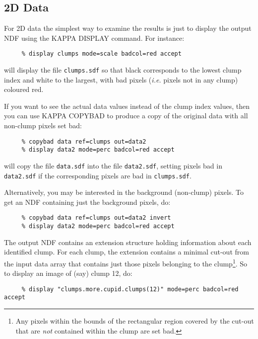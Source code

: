 \documentclass[twoside,11pt]{article}
\newcommand{\xref}[3]{#1}
\renewcommand{\_}{\texttt{\symbol{95}}}
\begin{document}
\subsection{2D Data}
For 2D data the simplest way to examine the results is just
to display the output NDF using the KAPPA \xref{DISPLAY}{sun95}{DISPLAY}
command. For instance:

\small
\begin{verbatim}
     % display clumps mode=scale badcol=red accept
\end{verbatim}
\normalsize

will display the file \verb+clumps.sdf+ so that black corresponds to the
lowest clump index and white to the largest, with bad pixels (\emph{i.e.}
pixels not in any clump) coloured red.

If you want to see the actual data values instead of the clump index
values, then you can use KAPPA \xref{COPYBAD}{sun95}{COPYBAD} to produce a
copy of the original data with all non-clump pixels set bad:

\small
\begin{verbatim}
     % copybad data ref=clumps out=data2
     % display data2 mode=perc badcol=red accept
\end{verbatim}
\normalsize

will copy the file \verb+data.sdf+ into the file \verb+data2.sdf+,
setting pixels bad in \verb+data2.sdf+ if the corresponding pixels
are bad in  \verb+clumps.sdf+.

Alternatively, you may be interested in the background (non-clump)
pixels. To get an NDF containing just the background pixels, do:

\small
\begin{verbatim}
     % copybad data ref=clumps out=data2 invert
     % display data2 mode=perc badcol=red accept
\end{verbatim}
\normalsize

The output NDF contains an extension structure holding information
about each identified clump. For each clump, the extension contains a
minimal cut-out from the input data array that contains just those pixels
belonging to the clump\footnote{Any pixels within the bounds of the
rectangular region covered by the cut-out that are \emph{not} contained
within the clump are set bad.}. So to display an image of (say) clump 12,
do:

\small
\begin{verbatim}
     % display "clumps.more.cupid.clumps(12)" mode=perc badcol=red accept
\end{verbatim}
\normalsize
\end{document}
